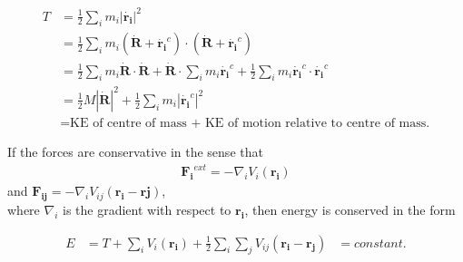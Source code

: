 \documentclass[a4paper]{article}
\begin{document}
\begin{equation*}
\begin{aligned}
T &= \frac{1}{2} \sum_{i} m_{i} |\dot{\mathbf{r_{i}}}|^2\\
&= \frac{1}{2} \sum_{i} m_{i} \left( \dot{\mathbf{R}} + \dot{\mathbf{r_{i}}}^c \right) \cdot \left( \dot{\mathbf{R}} + \dot{\mathbf{r_{i}}}^c \right)\\
&= \frac{1}{2} \sum_{i} m_{i} \dot{\mathbf{R}} \cdot \dot{\mathbf{R}} + \dot{\mathbf{R}}\cdot \sum_{i} m_{i}\dot{\mathbf{r_{i}}}^c + \frac{1}{2} \sum_{i} m_{i} \dot{\mathbf{r_{i}}}^c \cdot \dot{\mathbf{r_{i}}}^c\\
&= \frac{1}{2} M |\dot{\mathbf{R}}|^2 + \frac{1}{2} \sum_{i} m_{i} |\dot{\mathbf{r_{i}}}^c|^2\\
&= \text{KE of centre of mass + KE of motion relative to centre of mass.}
\end{aligned}
\end{equation*}

If the forces are conservative in the sense that 
\begin{equation*}
\begin{aligned}
\mathbf{F_{i}}^{ext} = -\nabla_{i} V_{i} \left(\mathbf{r_{i}}\right)
\end{aligned}
\end{equation*}
and $\mathbf{F_{ij}} = -\nabla_{i} V_{ij} \left(\mathbf{r_{i}}-\mathbf{r{j}}\right)$,\\
where $\nabla_{i}$ is the gradient with respect to $\mathbf{r_{i}}$, then energy is conserved in the form

\begin{equation*}
\begin{aligned}
E &= T + \sum_{i} V_{i} \left(\mathbf{r_{i}}\right) + \frac{1}{2} \sum_{i} \sum_{j} V_{ij}\left(\mathbf{r_{i}}-\mathbf{r_{j}}\right) &= constant.
\end{aligned}
\end{equation*}
\end{document}
